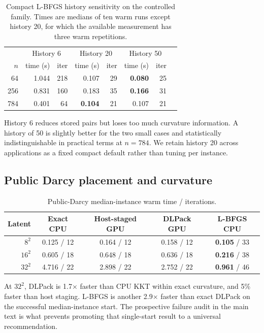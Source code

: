 \begin{table}[ht]
\centering
\caption{Compact L-BFGS history sensitivity on the controlled family.  Times
are medians of ten warm runs except history 20, for which the available
measurement has three warm repetitions.}
\label{tab:history}
\small
\begin{tabular}{rrrrrrrr}
\toprule
& \multicolumn{2}{c}{History 6} & \multicolumn{2}{c}{History 20} & \multicolumn{2}{c}{History 50}\\
$n$ & time (s) & iter & time (s) & iter & time (s) & iter\\
\midrule
64  & 1.044 & 218 & 0.107 & 29 & \textbf{0.080} & 25\\
256 & 0.831 & 160 & 0.183 & 35 & \textbf{0.166} & 31\\
784 & 0.401 & 64  & \textbf{0.104} & 21 & 0.107 & 21\\
\bottomrule
\end{tabular}
\end{table}

History 6 reduces stored pairs but loses too much curvature information.  A
history of 50 is slightly better for the two small cases and statistically
indistinguishable in practical terms at $n=784$.  We retain history 20 across
applications as a fixed compact default rather than tuning per instance.

\subsection{Public Darcy placement and curvature}

\begin{table}[ht]
\centering
\caption{Public-Darcy median-instance warm time / iterations.}
\label{tab:darcy-paths}
\small
\setlength{\tabcolsep}{3pt}
\begin{tabular}{rcccc}
\toprule
Latent & Exact CPU & Host-staged GPU & DLPack GPU & L-BFGS CPU\\
\midrule
$8^2$  & 0.125 / 12 & 0.164 / 12 & 0.158 / 12 & \textbf{0.105} / 33\\
$16^2$ & 0.605 / 18 & 0.648 / 18 & 0.636 / 18 & \textbf{0.216} / 38\\
$32^2$ & 4.716 / 22 & 2.898 / 22 & 2.752 / 22 & \textbf{0.961} / 46\\
\bottomrule
\end{tabular}
\end{table}

At $32^2$, DLPack is 1.7$\times$ faster than CPU KKT within exact curvature,
and 5\% faster than host staging.  L-BFGS is another 2.9$\times$ faster than
exact DLPack on the successful median-instance start.  The prospective failure
audit in the main text is what prevents promoting that single-start result to
a universal recommendation.

